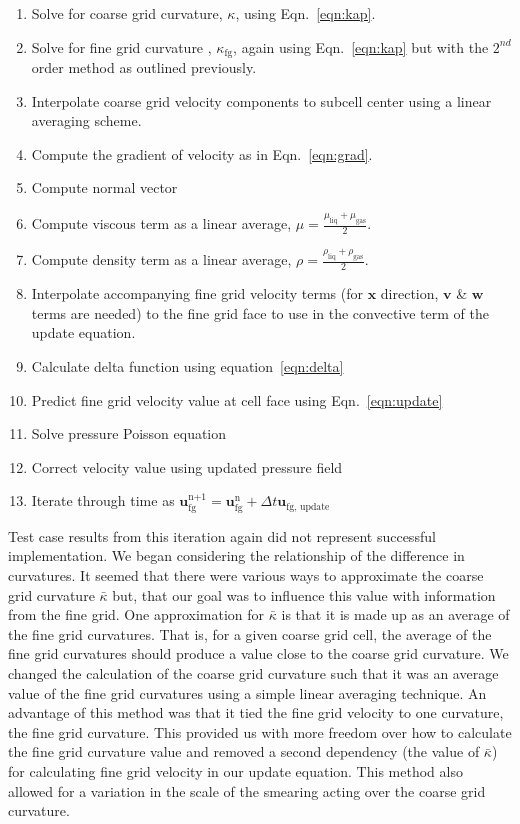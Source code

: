\begin{enumerate}
	\item Solve for coarse grid curvature, $\kappa$, using Eqn.~\ref{eqn:kap}.
	\item Solve for fine grid curvature , $\kappa_{\text{fg}}$, again using Eqn.~\ref{eqn:kap} but with the $2^{nd}$ order method as outlined previously.
	\item Interpolate coarse grid velocity components to subcell center using a linear averaging scheme.
	\item Compute the gradient of velocity as in Eqn.~\ref{eqn:grad}.
	\item Compute normal vector 
	\item Compute viscous term as a linear average, $\mu =\frac{ \mu_{\text{liq}} + \mu_{\text{gas}}}{2}$.
	\item Compute density term as a linear average, $\rho =\frac{ \rho_{\text{liq}} + \rho_{\text{gas}}}{2}$.
	\item Interpolate accompanying fine grid velocity terms (for $\bm{x}$ direction, $\bm{v}$ \& $\bm{w}$ terms are needed) to the fine grid face to use in the convective term of the update equation.
	\item Calculate delta function using equation~\ref{eqn:delta}
	\item Predict fine grid velocity value at cell face using Eqn.~\ref{eqn:update}
	\item Solve pressure Poisson equation 
	\item Correct velocity value using updated pressure field 
	\item Iterate through time as $\bm{u}_{\text{fg}}^{\text{n+1}}  = \bm{u}_{\text{fg}}^{\text{n}}+ \Delta t \bm{u}_{\text{fg, update}}$
\end{enumerate}

Test case results from this iteration again did not represent successful implementation. We began considering the relationship of the difference in curvatures. It seemed that there were various ways to approximate the coarse grid curvature $\bar{\kappa}$ but, that our goal was to influence this value with information from the fine grid. One approximation for $\bar{\kappa}$ is that it is made up as an average of the fine grid curvatures. That is, for a given coarse grid cell, the average of the fine grid curvatures should produce a value close to the coarse grid curvature. We changed the calculation of the coarse grid curvature such that it was an average value of the fine grid curvatures using a simple linear averaging technique. An advantage of this method was that it tied the fine grid velocity to one curvature, the fine grid curvature. This provided us with more freedom over how to calculate the fine grid curvature value and removed a second dependency (the value of $\bar{\kappa}$) for calculating fine grid velocity in our update equation. This method also allowed for a variation in the scale of the smearing acting over the coarse grid curvature.

